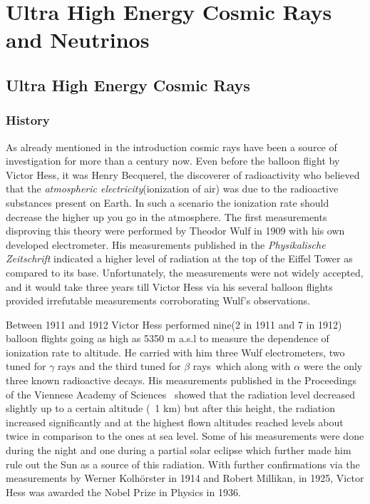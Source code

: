 
\chapter{Ultra High Energy Cosmic Rays and Neutrinos}
\label{chap:crnNu}

\section{Ultra High Energy Cosmic Rays}
\label{sec:UHECR}
\subsection{History}
\label{subsec:crhist}
As already mentioned in the introduction cosmic rays have been a source of investigation for more than a century now. Even before the balloon flight by Victor Hess, it was Henry Becquerel, the discoverer of radioactivity who believed that the \textit{atmospheric electricity}(ionization of air) was due to the radioactive substances present on Earth. In such a scenario the ionization rate should decrease the higher up you go in the atmosphere. The first measurements disproving this theory were performed by Theodor Wulf in 1909 with his own developed electrometer. His measurements published in the \textit{Physikalische Zeitschrift} indicated a higher level of radiation at the top of the Eiffel Tower as compared to its base. Unfortunately, the measurements were not widely accepted, and it would take three years till Victor Hess via his several balloon flights provided irrefutable measurements corroborating Wulf's observations.

Between 1911 and 1912 Victor Hess performed nine(2 in 1911 and 7 in 1912) balloon flights going as high as 5350 m a.s.l to measure the dependence of ionization rate to altitude. He carried with him three Wulf electrometers, two tuned for $\gamma$ rays and the third tuned for $\beta$ rays~\cite{hess2018observationspenetratingradiationseven}which along with $\alpha$ were the only three known radioactive decays. His measurements published in the Proceedings of the Viennese Academy of Sciences~\cite{Hess:1912srp} showed that the radiation level decreased slightly up to a certain altitude (~1 km) but after this height, the radiation increased significantly and at the highest flown altitudes reached levels about twice in comparison to the ones at sea level. Some of his measurements were done during the night and one during a partial solar eclipse which further made him rule out the Sun as a source of this radiation. With further confirmations via the measurements by Werner Kolhörster in 1914 and Robert Millikan, in 1925, Victor Hess was awarded the Nobel Prize in Physics in 1936. 

